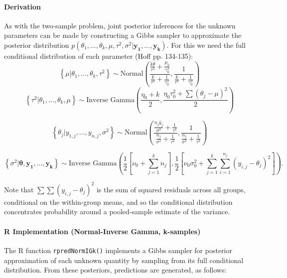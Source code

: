 \documentclass[12pt, a4paper]{article}
\begin{document}
      \paragraph{Derivation}
      As with the two-sample problem, joint posterior inferences for the unknown parameters can be made by constructing a Gibbs sampler to approximate the posterior distribution $p\left(\theta_1,...,\theta_k,\mu,\tau^2,\sigma^2|\mathbf{y_1,...,y_k}\right)$.  For this we need the full conditional distribution of each parameter (Hoff pp. 134-135):
      $$\left\{\mu|\theta_1,...,\theta_k,\tau^2\right\} \sim \text{Normal}\left(\dfrac{\frac{k\bar{\theta}}{\tau^2} + \frac{\mu_0}{\gamma^2_0}}{\frac{k}{\tau^2} + \frac{1}{\gamma^2_0}},\dfrac{1}{\frac{k}{\tau^2}+\frac{1}{\gamma^2_0}}\right)$$
      $$\left\{\tau^2|\theta_1,...,\theta_k,\mu\right\} \sim \text{Inverse Gamma}\left(\dfrac{\eta_0 + k}{2},\dfrac{\eta_0\tau^2_0 + \sum\left(\theta_j-\mu\right)^2}{2}\right)$$

      $$\left\{\theta_j|y_{1,j},...,y_{n,j},\sigma^2\right\} \sim \text{Normal}\left(\dfrac{\frac{n_j\bar{y}_j}{\sigma^2} + \frac{1}{\tau^2}}{\frac{n_j}{\sigma^2}+\frac{1}{\tau^2}},\dfrac{1}{\frac{n_j}{\sigma^2}+\frac{1}{\tau^2}}\right)$$

      $$\left\{\sigma^2|\mathbf{\theta,y_1,...,y_k}\right\} \sim \text{Inverse Gamma}\left(\dfrac{1}{2}\left[\nu_0 + \sum_{j=1}^k n_j\right],\dfrac{1}{2}\left[\nu_0\sigma^2_0 + \sum_{j=1}^k\sum_{i=1}^{n_j}\left(y_{i,j}-\theta_j\right)^2\right]\right).$$

\noindent Note that $\sum\sum\left(y_{i,j}-\theta_j\right)^2$ is the sum of squared residuals across all groups, conditional on the within-group means, and so the conditional distribution concentrates probability around a pooled-sample estimate of the variance.


      \paragraph{R Implementation (Normal-Inverse Gamma, k-samples)}

      The R function \texttt{rpredNormIGk()} implements a Gibbs sampler for posterior approximation of each unknown quantity by sampling from its full conditional distribution.  From these posteriors, predictions are generated, as follows:
\end{document}
